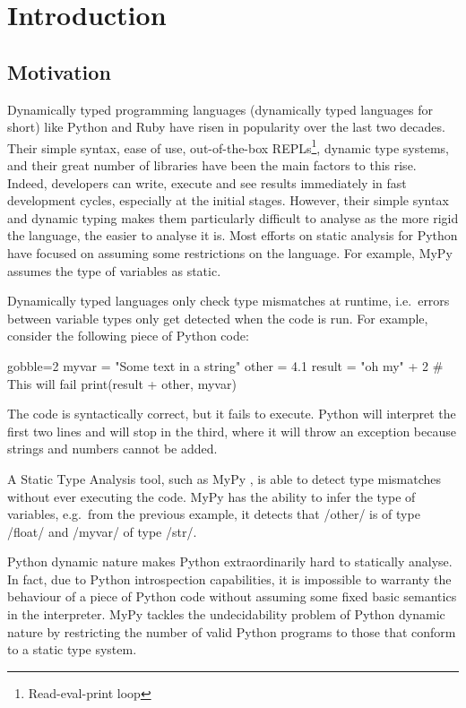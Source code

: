 \chapter{Introduction}\label{introduction}

\section{Motivation}\label{motivation}

Dynamically typed programming languages (dynamically typed languages for short) like
Python and Ruby have risen in popularity over the last two decades. Their simple syntax,
ease of use, out-of-the-box REPLs\footnote{Read-eval-print loop}, dynamic type systems,
and their great number of libraries have been the main factors to this rise. Indeed,
developers can  write, execute and see results immediately in fast development cycles,
especially at the initial stages. However, their simple syntax and dynamic typing makes
them particularly difficult to analyse as the more rigid the language, the easier to
analyse it is. Most efforts on static analysis for Python have focused on assuming some
restrictions on the language. For example, MyPy \autocite{lehtosalo2016mypy} assumes the
type of variables as static.

Dynamically typed languages only check type mismatches at runtime, i.e.~errors between
variable types only get detected when the code is run. For example,
consider the following piece of Python code:

\begin{pythoncode*}{gobble=2}
  myvar = "Some text in a string"
  other = 4.1
  result = "oh my" + 2  # This will fail
  print(result + other, myvar)
\end{pythoncode*}

The code is syntactically correct, but it fails to execute. Python will interpret the first
two lines and will stop in the third, where it will throw an exception because strings
and numbers cannot be added.

A Static Type Analysis tool, such as MyPy \autocite{lehtosalo2016mypy}, is able to detect
type mismatches without ever executing the code.  MyPy has the ability to infer the type
of variables, e.g.~from the previous example, it detects that \pycode/other/ is of type
\pycode/float/ and \pycode/myvar/ of type \pycode/str/.

Python dynamic nature makes Python extraordinarily hard to statically analyse. In fact,
due to Python introspection capabilities, it is impossible to warranty the behaviour of a
piece of Python code without assuming some fixed basic semantics in the interpreter.  MyPy
tackles the undecidability problem of Python dynamic nature by restricting the number
of valid Python programs to those that conform to a static type system\footnotemark.

